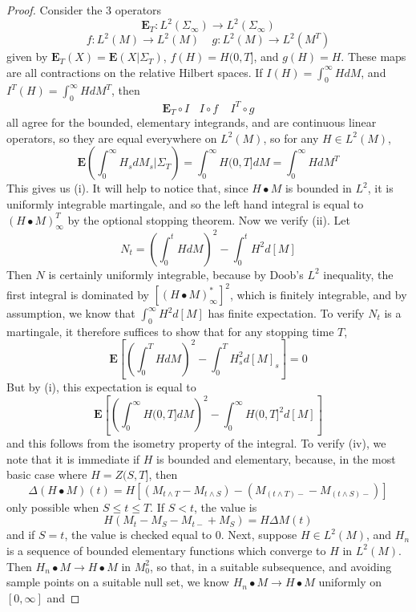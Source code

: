 \begin{proof}
    Consider the 3 operators
    \[ \mathbf{E}_T: L^2(\Sigma_\infty) \to L^2(\Sigma_\infty) \]
    \[ f: L^2(M) \to L^2(M)\ \ \ \ \ g: L^2(M) \to L^2(M^T) \]
    given by $\mathbf{E}_T(X) = \mathbf{E}(X|\Sigma_T)$, $f(H) = H(0,T]$, and $g(H) = H$. These maps are all contractions on the relative Hilbert spaces. If $I(H) = \int_0^\infty H dM$, and $I^T(H) = \int_0^\infty H dM^T$, then
    \[ \mathbf{E}_T \circ I\ \ \ \ I \circ f\ \ \ \ \ I^T \circ g \]
    all agree for the bounded, elementary integrands, and are continuous linear operators, so they are equal everywhere on $L^2(M)$, so for any $H \in L^2(M)$,
    \[ \mathbf{E} \left( \int_0^\infty H_s dM_s | \Sigma_T \right) = \int_0^\infty H(0,T] dM = \int_0^\infty H dM^T \]
    This gives us (i). It will help to notice that, since $H \bullet M$ is bounded in $L^2$, it is uniformly integrable martingale, and so the left hand integral is equal to $(H \bullet M)^T_\infty$ by the optional stopping theorem. Now we verify (ii). Let
    \[ N_t = \left( \int_0^t H dM \right)^2 - \int_0^t H^2 d[M] \]
    Then $N$ is certainly uniformly integrable, because by Doob's $L^2$ inequality, the first integral is dominated by $[(H \bullet M)_\infty^*]^2$, which is finitely integrable, and by assumption, we know that $\int_0^\infty H^2 d[M]$ has finite expectation. To verify $N_t$ is a martingale, it therefore suffices to show that for any stopping time $T$,
    \[ \mathbf{E} \left[ \left( \int_0^T H dM \right)^2 - \int_0^T H_s^2 d[M]_s \right] = 0 \]
    But by (i), this expectation is equal to
    \[ \mathbf{E} \left[ \left( \int_0^\infty H(0,T] dM \right)^2 - \int_0^\infty H(0,T]^2 d[M] \right] \]
    and this follows from the isometry property of the integral. To verify (iv), we note that it is immediate if $H$ is bounded and elementary, because, in the most basic case where $H = Z(S,T]$, then
    \[\Delta (H \bullet M)(t) = H \left[ \left( M_{t \wedge T} - M_{t \wedge S} \right) - \left( M_{(t \wedge T)-} - M_{(t \wedge S)-} \right) \right] \]
    only possible when $S \leq t \leq T$. If $S < t$, the value is
    \[ H ( M_t - M_S - M_{t-} + M_S ) = H \Delta M(t) \]
    and if $S = t$, the value is checked equal to 0. Next, suppose $H \in L^2(M)$, and $H_n$ is a sequence of bounded elementary functions which converge to $H$ in $L^2(M)$. Then $H_n \bullet M \to H \bullet M$ in $M^2_0$, so that, in a suitable subsequence, and avoiding sample points on a suitable null set, we know $H_n \bullet M \to H \bullet M$ uniformly on $[0,\infty]$ and

\end{proof}
